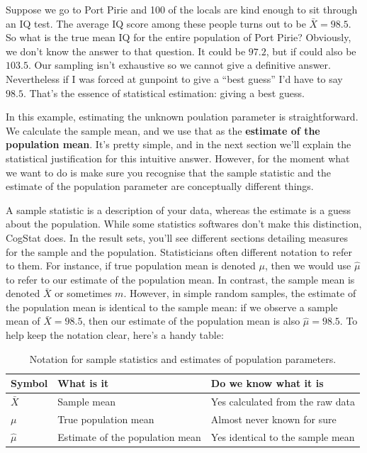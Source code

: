 \documentclass[
  11pt,
  a4paper,
  twoside,symmetric,openright]{book}
\theoremstyle{break}
\theoremstyle{break}
\begin{document}
Suppose we go to Port Pirie and 100 of the locals are kind enough to sit through an IQ test. The average IQ score among these people turns out to be \(\bar{X}=98.5\). So what is the true mean IQ for the entire population of Port Pirie? Obviously, we don't know the answer to that question. It could be \(97.2\), but if could also be \(103.5\). Our sampling isn't exhaustive so we cannot give a definitive answer. Nevertheless if I was forced at gunpoint to give a ``best guess'' I'd have to say \(98.5\). That's the essence of statistical estimation: giving a best guess.

In this example, estimating the unknown poulation parameter is straightforward. We calculate the sample mean, and we use that as the \textbf{estimate of the population mean}. It's pretty simple, and in the next section we'll explain the statistical justification for this intuitive answer. However, for the moment what we want to do is make sure you recognise that the sample statistic and the estimate of the population parameter are conceptually different things.

A sample statistic is a description of your data, whereas the estimate is a guess about the population. While some statistics softwares don't make this distinction, CogStat does. In the result sets, you'll see different sections detailing measures for the sample and the population. Statisticians often different notation to refer to them. For instance, if true population mean is denoted \(\mu\), then we would use \(\hat\mu\) to refer to our estimate of the population mean. In contrast, the sample mean is denoted \(\bar{X}\) or sometimes \(m\). However, in simple random samples, the estimate of the population mean is identical to the sample mean: if we observe a sample mean of \(\bar{X} = 98.5\), then our estimate of the population mean is also \(\hat\mu = 98.5\). To help keep the notation clear, here's a handy table:

\begin{table}[!h]

\caption{\label{tab:unnamed-chunk-27}Notation for sample statistics and estimates of population parameters.}
\centering
\begin{tabular}[t]{lll}
\toprule
Symbol & What is it & Do we know what it is\\
\midrule
$\bar{X}$ & Sample mean & Yes  calculated from the raw data\\
$\mu$ & True population mean & Almost never known for sure\\
$\hat{\mu}$ & Estimate of the population mean & Yes  identical to the sample mean\\
\bottomrule
\end{tabular}
\end{table}
\end{document}
